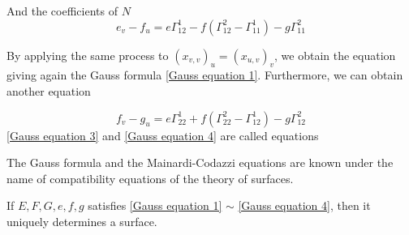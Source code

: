     And the coefficients of  $ N $
    \begin{equation}\label{Gauss equation 3}
        e_v-f_u=e\Gamma_{12}^1-f(\Gamma_{12}^2-\Gamma_{11}^1)-g\Gamma_{11}^2
    \end{equation} 

By applying the same process  to  $ (x_{v,v})_u=(x_{u,v})_v $, we obtain the equation giving again the
Gauss formula \eqref{Gauss equation 1}. Furthermore, we can obtain another equation 

\begin{equation}\label{Gauss equation 4}
    f_v-g_u=e\Gamma_{22}^1+f(\Gamma_{22}^2-\Gamma_{12}^1)-g\Gamma_{12}^2        
\end{equation}
\eqref{Gauss equation 3} and \eqref{Gauss equation 4} are called  equations

The Gauss formula and the Mainardi-Codazzi equations are known under the name of compatibility equations of the theory of surfaces.
\begin{theorem}
    If  $ E,F,G,e,f,g $ satisfies \eqref{Gauss equation 1}  $ \sim $  \eqref{Gauss equation 4}, then it uniquely determines a surface.
\end{theorem}
